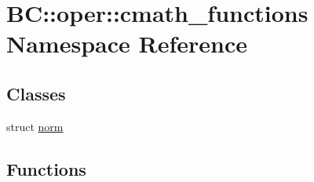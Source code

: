 \hypertarget{namespaceBC_1_1oper_1_1cmath__functions}{}\section{BC\+:\+:oper\+:\+:cmath\+\_\+functions Namespace Reference}
\label{namespaceBC_1_1oper_1_1cmath__functions}
\subsection*{Classes}
\begin{DoxyCompactItemize}
\item 
struct \hyperlink{structBC_1_1oper_1_1cmath__functions_1_1norm}{norm}
\end{DoxyCompactItemize}
\subsection*{Functions}
